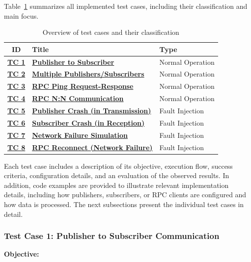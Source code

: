 \vspace{0.3em}
Table~\ref{tab:test_case_overview} summarizes all implemented test cases, including their classification and main focus.
\begin{table}[H]
	\renewcommand{\arraystretch}{1.45}
	\setlength{\tabcolsep}{10pt}
	\centering
	\begin{tabular}{|c|l|l|}
		\hline
		\textbf{ID} & \textbf{Title} & \textbf{Type} \\
		\hline
		\textbf{\hyperref[sec:tc1]{TC 1}} & \textbf{\hyperref[sec:tc1]{Publisher to Subscriber}} & Normal Operation \\
		\hline
		\textbf{\hyperref[sec:tc2]{TC 2}} & \textbf{\hyperref[sec:tc2]{Multiple Publishers/Subscribers}} & Normal Operation \\
		\hline
		\textbf{\hyperref[sec:tc3]{TC 3}} & \textbf{\hyperref[sec:tc3]{RPC Ping Request-Response}} & Normal Operation \\
		\hline
		\textbf{\hyperref[sec:tc4]{TC 4}} & \textbf{\hyperref[sec:tc4]{RPC N:N Communication}} & Normal Operation \\
		\hline
		\textbf{\hyperref[sec:tc5]{TC 5}} & \textbf{\hyperref[sec:tc5]{Publisher Crash (in Transmission)}} & Fault Injection \\
		\hline
		\textbf{\hyperref[sec:tc6]{TC 6}} & \textbf{\hyperref[sec:tc6]{Subscriber Crash (in Reception)}} & Fault Injection \\
		\hline
		\textbf{\hyperref[sec:tc7]{TC 7}} & \textbf{\hyperref[sec:tc7]{Network Failure Simulation}} & Fault Injection \\
		\hline
		\textbf{\hyperref[sec:tc8]{TC 8}} & \textbf{\hyperref[sec:tc8]{RPC Reconnect (Network Failure)}} & Fault Injection \\
		\hline
	\end{tabular}
	\caption{Overview of test cases and their classification}
	\label{tab:test_case_overview}
\end{table}

Each test case includes a description of its objective, execution flow, success criteria, configuration details, and an evaluation of the observed results.  In addition, code examples are provided to illustrate relevant implementation details, including how publishers, subscribers, or RPC clients are configured and how data is processed. The next subsections present the individual test cases in detail.

\vspace{1em}
\subsubsection{Test Case 1: Publisher to Subscriber Communication}
\label{sec:tc1}
\textbf{Objective:}

